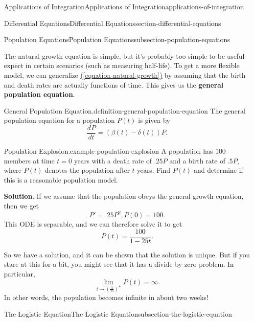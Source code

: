 \documentclass[oneside,10pt,]{book}
\newcommand{\terminology}[1]{\textbf{#1}}
\numberwithin{equation}{section}
\newcommand{\dv}[3][]{\dfrac{d^{#1} #2}{d #3^{#1}}}
\begin{document}
\begin{chapterptx}{Applications of Integration}{}{Applications of Integration}{}{}{applications-of-integration}
\begin{sectionptx}{Differential Equations}{}{Differential Equations}{}{}{section-differential-equations}
\begin{subsectionptx}{Population Equations}{}{Population Equations}{}{}{subsection-population-equations}
\par
\hypertarget{p-738}{}%
The natural growth equation is simple, but it's probably too simple to be useful expect in certain scenarios (such as measuring half-life). To get a more flexible model, we can generalize \hyperref[equation-natural-growth]{(\ref{equation-natural-growth})} by assuming that the birth and death rates are actually functions of time. This gives us the \terminology{general population equation}.%
\begin{definition}{General Population Equation.}{definition-general-population-equation}%
\hypertarget{p-739}{}%
The general population equation for a population \(P(t)\) is given by%
\begin{equation*}
\dv{P}{t} = (\beta(t) - \delta(t))P.
\end{equation*}
%
\end{definition}
\begin{example}{Population Explosion.}{example-population-explosion}%
\hypertarget{p-740}{}%
A population has \(100\) members at time \(t = 0\) years with a death rate of \(.25P\) and a birth rate of \(.5P\), where \(P(t)\) denotes the population after \(t\) years. Find \(P(t)\) and determine if this is a reasonable population model.%
\par\smallskip%
\noindent\textbf{Solution}.\hypertarget{solution-155}{}\quad%
\hypertarget{p-741}{}%
If we assume that the population obeys the general growth equation, then we get%
\begin{equation*}
P' = .25P^{2}, P(0) = 100.
\end{equation*}
This ODE is separable, and we can therefore solve it to get%
\begin{equation*}
P(t) = \frac{100}{1 - 25t}.
\end{equation*}
%
\par
\hypertarget{p-742}{}%
So we have a solution, and it can be shown that the solution is unique. But if you stare at this for a bit, you might see that it has a divide-by-zero problem. In particular,%
\begin{equation*}
\lim_{t\to(\frac{1}{25})^{+}}P(t) = \infty.
\end{equation*}
In other words, the population becomes infinite in about two weeks!%
\end{example}
\end{subsectionptx}
%
%
\typeout{************************************************}
\typeout{************************************************}
%
\begin{subsectionptx}{The Logistic Equation}{}{The Logistic Equation}{}{}{subsection-the-logistic-equation}

\end{subsectionptx}
\end{sectionptx}
\end{chapterptx}
\end{document}
